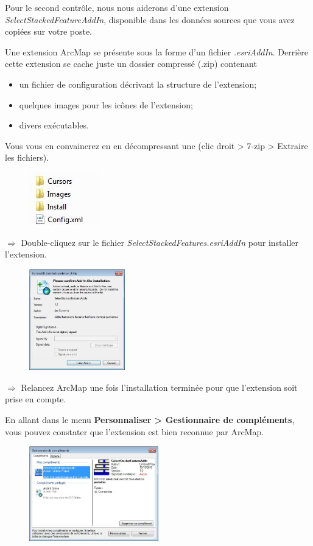 \documentclass[11pt]{article}
\newcommand{\action}{$\Rightarrow$ }
\begin{document}
Pour le second contrôle, nous nous aiderons d'une extension \textit{SelectStackedFeatureAddIn}, disponible dans les données sources que vous avez copiées sur votre poste.

Une extension ArcMap se présente sous la forme d'un fichier \textit{.esriAddIn}.
Derrière cette extension se cache juste un dossier compressé (.zip) contenant
\begin{itemize}
  \item un fichier de configuration décrivant la structure de l'extension;
  \item quelques images pour les icônes de l'extension;
  \item divers exécutables.
\end{itemize}
Vous vous en convaincrez en en décompressant une (clic droit > 7-zip > Extraire les fichiers).
\begin{figure}[H]
	\center \includegraphics{img/cours3/contenu_addin.jpg} \\
\end{figure}

\action Double-cliquez sur le fichier \textit{SelectStackedFeatures.esriAddIn} pour installer l'extension.
\begin{figure}[H]
	\center \includegraphics[width=0.37\textwidth]{img/cours3/install_addin.jpg} \\
\end{figure}

\action Relancez ArcMap une fois l'installation terminée pour que l'extension soit prise en compte.

En allant dans le menu \textbf{Personnaliser > Gestionnaire de compléments}, vous pouvez constater que l'extension est bien reconnue par ArcMap.
\begin{figure}[H]
	\center \includegraphics[width=0.5\textwidth]{img/cours3/am_gestionnaire_complements.jpg} \\
\end{figure}
\end{document}
